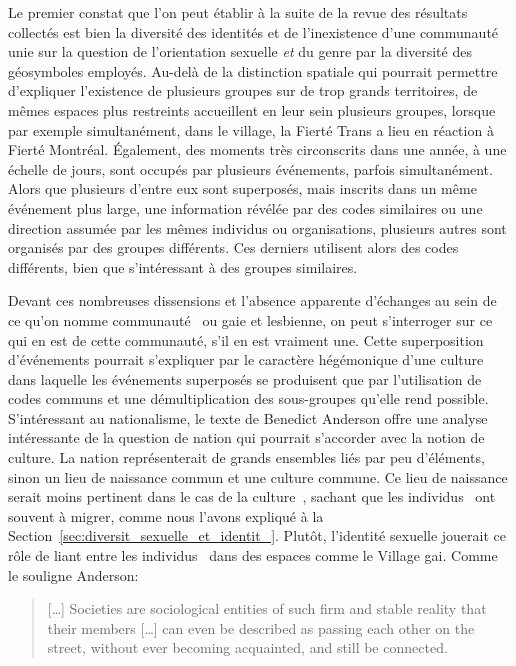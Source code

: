Le premier constat que l'on peut établir à la suite de la revue des résultats collectés est bien la diversité des identités \lgbt{} et de l'inexistence d'une communauté unie sur la question de l'orientation sexuelle \emph{et} du genre par la diversité des géosymboles employés.
Au-delà de la distinction spatiale qui pourrait permettre d'expliquer l'existence de plusieurs groupes sur de trop grands territoires, de mêmes espaces plus restreints accueillent en leur sein plusieurs groupes, lorsque par exemple simultanément, dans le village, la Fierté Trans a lieu en réaction à Fierté Montréal.
Également, des moments très circonscrits dans une année, à une échelle de jours, sont occupés par plusieurs événements, parfois simultanément.
Alors que plusieurs d'entre eux sont superposés, mais inscrits dans un même événement plus large, une information révélée par des codes similaires ou une direction assumée par les mêmes individus ou organisations, plusieurs autres sont organisés par des groupes différents. 
Ces derniers utilisent alors des codes différents, bien que s'intéressant à des groupes similaires.

Devant ces nombreuses dissensions et l'absence apparente d'échanges au sein de ce qu'on nomme communauté~\lgbt{} ou gaie et lesbienne, on peut s'interroger sur ce qui en est de cette communauté, s'il en est vraiment une.
Cette superposition d'événements pourrait s'expliquer par le caractère hégémonique d'une culture~\lgbt{} dans  laquelle les événements superposés se produisent que par l'utilisation de codes communs et une démultiplication des sous-groupes qu'elle rend possible.
S'intéressant au nationalisme, le texte de Benedict Anderson offre une analyse intéressante de la question de nation qui pourrait s'accorder avec la notion de culture. 
La nation représenterait de grands ensembles liés par peu d'éléments, sinon un lieu de naissance commun et une culture commune.
Ce lieu de naissance serait moins pertinent dans le cas de la culture~\lgbt{}, sachant que les individus~\lgbt{} ont souvent à migrer, comme nous l'avons expliqué à la Section~\ref{sec:diversit_sexuelle_et_identit_}.
Plutôt, l'identité sexuelle jouerait ce rôle de liant entre les individus~\lgbt{} dans des espaces comme le Village gai.
Comme le souligne Anderson:
\begin{quote}
  [\ldots] Societies are sociological entities of such firm and stable reality that their members [\ldots] can even be described as passing each other on the street, without ever becoming acquainted, and still be connected.~\citep[25]{Anderson1983}
\end{quote}

